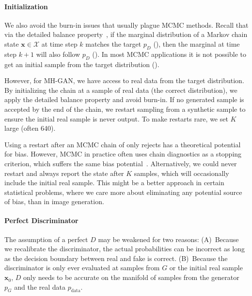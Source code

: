 \documentclass{article}
\renewcommand{\vec}[1]{{\boldsymbol{\mathbf{#1}}}} %
\newcommand{\set}[1]{\mathcal{#1}}
\newcommand{\sample}{\sim}
\newcommand{\PG}{{p_G}}
\newcommand{\PD}{{p_D}}
\newcommand{\PR}{{p_{\textrm{data}}}}
\newcommand{\setx}{\set{X}}
\begin{document}
\paragraph{Initialization}
We also avoid the burn-in issues that usually plague MCMC methods.
Recall that via the detailed balance property~\citep[Ch.~1]{Gilks1996}, if the marginal distribution of a Markov chain state $\vec x \in \setx$ at time step $k$ matches the target $\PD$ (\smash{$\vec x_k \sample \PD$}), then the marginal at time step $k+1$ will also follow $\PD$ (\smash{$\vec x_{k+1} \sample \PD$})\@.
In most MCMC applications it is not possible to get an initial sample from the target distribution (\smash{$\vec x_0 \sample \PD$})\@.

However, for MH-GAN, we have access to real data from the target distribution.
By initializing the chain at a sample of real data (the correct distribution), we apply the detailed balance property and avoid burn-in.
If no generated sample is accepted by the end of the chain, we restart sampling from a synthetic sample to ensure the initial real sample is never output.
To make restarts rare, we set $K$ large (often 640)\@.

Using a restart after an MCMC chain of only rejects has a theoretical potential for bias.
However, MCMC in practice often uses chain diagnostics as a stopping criterion, which suffers the same bias potential~\citep{Cowles1999}.
Alternatively, we could never restart and always report the state after $K$ samples, which will occasionally include the initial real sample.
This might be a better approach in certain statistical problems, where we care more about eliminating any potential source of bias, than in image generation.

\paragraph{Perfect Discriminator}
The assumption of a perfect $D$ may be weakened for two reasons:
(A)~Because we recalibrate the discriminator, the actual probabilities can be incorrect as long as the decision boundary between real and fake is correct.
(B)~Because the discriminator is only ever evaluated at samples from $G$ or the initial real sample $\vec x_0$, $D$ only needs to be accurate on the manifold of samples from the generator $\PG$ and the real data $\PR$.




\end{document}
